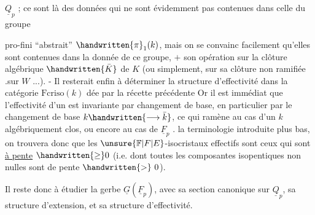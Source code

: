 $\underline{Q}_p$ ; ce sont là des données qui ne sont évidemment pas contenues dans celle du groupe



pro-fini ``abstrait'' $\handwritten{\pi}_1(k)$, mais on se convainc facilement qu'elles sont contenues dans la donnée de ce groupe, $+$ son opération sur la clôture algébrique $\handwritten{\bar{K}}$ de $K$ (ou simplement, sur sa clôture non ramifiée .sur $W$ ...)\handwritten{/}. - Il resterait enfin à déterminer la structure d'effectivité dans la catégorie $\mathrm{Fcriso}(k)$ dée par la récette précédente Or il est immédiat que l'effectivité d'un  est invariante par changement de base, en particulier par le changement de base $k\handwritten{\longrightarrow\bar{k}}$, ce qui ramène au cas d'un $k$ algébriquement clos, ou encore au cas de $\underline{F}_p$ .   la terminologie introduite plus bas, on trouvera donc que les $\unsure{\mathbb{F}|F|E}$-isocristaux effectifs sont ceux qui sont \uline{à pente} $\handwritten{\geq}0$ (i.e. dont toutes les composantes isopentiques  non nulles sont de pente $\handwritten{>}\ 0$).

 Il reste donc à étudier la gerbe $\underline{G}(\underline{F}_p)$, avec sa  section canonique sur $\underline{Q}_p$, sa structure d'extension, et sa structure d'effectivité.

